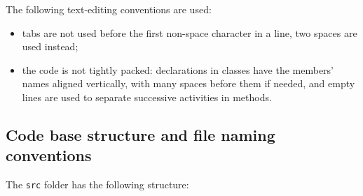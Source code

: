 \documentclass[12pt,a4paper]{article}
\begin{document}
The following text-editing conventions are used:
\begin{itemize}
\item tabs are not used before the first non-space character in a line, two spaces are used instead;

\item the code is not tightly packed: declarations in classes have the members' names aligned vertically, with many spaces before them if needed, and empty lines are used to separate successive activities in methods.
\end{itemize}

\subsection{Code base structure and file naming conventions}

The {\tt src} folder has the following structure:
\end{document}
